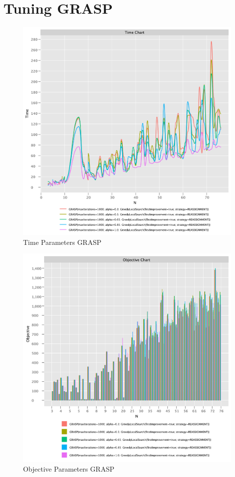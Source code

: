 \documentclass{article}
\begin{document}
\newpage

\section{Tuning GRASP}

\begin{figure}[!h]
    \centering
    \includegraphics[width=1\textwidth]{./documentation/assets/GRASPParams.timeChart.pdf}
    \caption{Time Parameters GRASP}
    \label{fig:grasp_time}
\end{figure}\FloatBarrier

\begin{figure}
    \centering
    \includegraphics[width=1\textwidth]{./documentation/assets/GRASPParams.objectiveChart.pdf}
    \caption{Objective Parameters GRASP}
    \label{fig:grasp_objective}
\end{figure}\FloatBarrier
\end{document}
